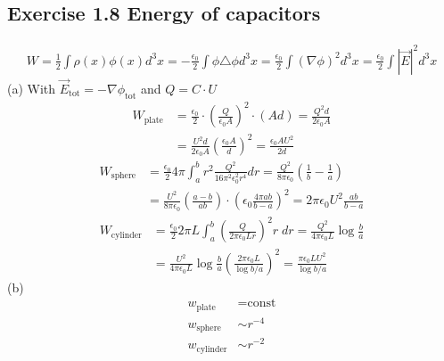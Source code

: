 \documentclass[../main.tex]{subfiles}
\begin{document}
\subsection{Exercise 1.8 Energy of capacitors}
\begin{align}
W
=\frac{1}{2}\int\rho(x)\phi(x)d^3x
=-\frac{\epsilon_0}{2}\int\phi\triangle\phi d^3x
=\frac{\epsilon_0}{2}\int(\nabla\phi)^2 d^3x
=\frac{\epsilon_0}{2}\int|\vec{E}|^2 d^3x
\end{align}
(a) With $\vec{E}_\text{tot}=-\nabla\phi_\text{tot}$ and $Q=C\cdot U$
\begin{align}
W_\text{plate}&=\frac{\epsilon_0}{2}\cdot\left(\frac{Q}{\epsilon_0A}\right)^2\cdot(Ad)=\frac{Q^2d}{2\epsilon_0A}\\
&=\frac{U^2d}{2\epsilon_0A}\left(\frac{\epsilon_0A}{d}\right)^2=
\frac{\epsilon_0AU^2}{2d}
\end{align}
\begin{align}
W_\text{sphere}&=\frac{\epsilon_0}{2}4\pi\int_a^br^2\frac{Q^2}{16\pi^2\epsilon_0^2r^4}dr=\frac{Q^2}{8\pi\epsilon_0}\left(\frac{1}{b}-\frac{1}{a}\right)\\
&=\frac{U^2}{8\pi\epsilon_0}\left(\frac{a-b}{ab}\right)\cdot\left(\epsilon_0\frac{4\pi ab}{b-a}\right)^2=2\pi\epsilon_0U^2\frac{ab}{b-a}
\end{align}
\begin{align}
W_\text{cylinder}&=\frac{\epsilon_0}{2}2\pi L\int_a^b\left(\frac{Q}{2\pi\epsilon_0Lr}\right)^2r\;dr
=\frac{Q^2}{4\pi\epsilon_0L}\log\frac{b}{a}\\
&=\frac{U^2}{4\pi\epsilon_0L}\log\frac{b}{a}\left(\frac{2\pi\epsilon_0 L}{\log b/a}\right)^2=\frac{\pi\epsilon_0LU^2}{\log b/a}
\end{align}
(b) 
\begin{align}
w_\text{plate}&=\text{const}\\
w_\text{sphere}&\sim r^{-4}\\
w_\text{cylinder}&\sim r^{-2}
\end{align}
\end{document}
